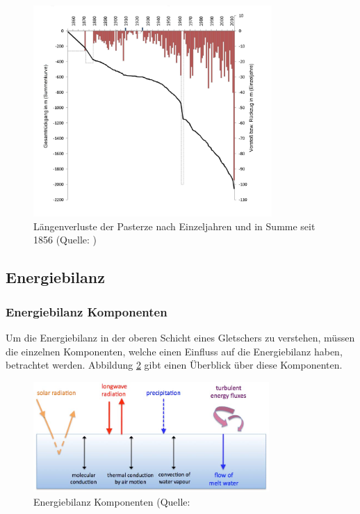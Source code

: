 \documentclass[11pt,a4paper]{article}
\begin{document}
\begin{figure}[H]
\centering
\includegraphics[width=0.81\textwidth]{pictures/pasterze_laengenaenderung.jpg}
\caption[Längenverluste der Pasterze nach Einzeljahren und in Summe seit 1856]{Längenverluste der Pasterze nach Einzeljahren und in Summe seit 1856  (Quelle:  \cite{LaengenaenderungPasterze})}
\label{fig:Längenverluste der Pasterze}
\end{figure}


\subsection{Energiebilanz}
\subsubsection{Energiebilanz Komponenten}\label{Energiebilanz Komponenten}
Um die Energiebilanz in der oberen Schicht eines Gletschers zu verstehen, müssen die einzelnen Komponenten, welche einen Einfluss auf die Energiebilanz haben, betrachtet werden. Abbildung \ref{fig:Energiebilanz Komponenten} gibt einen Überblick über diese Komponenten.

\begin{figure}[H]
\centering
\includegraphics[width=0.8\textwidth]{pictures/energy_balance_components.png}
\caption[Energiebilanz Komponenten]{Energiebilanz Komponenten (Quelle: \cite{Themicroclimateofvalleyglaciers)}}
\label{fig:Energiebilanz Komponenten}
\end{figure}
\end{document}
